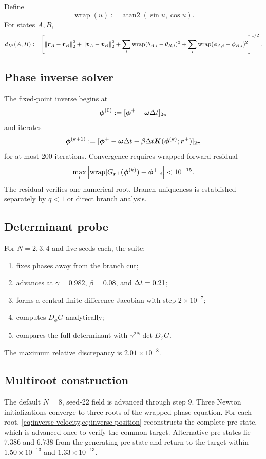 Define
\[
\operatorname{wrap}(u)
:=
\operatorname{atan2}(\sin u,\cos u).
\]
For states \(A,B\),
\begin{equation}
d_{L^2}(A,B)
:=
\left[
\left\lVert \bm r_A-\bm r_B\right\rVert_2^2
+\left\lVert \bm v_A-\bm v_B\right\rVert_2^2
+\sum_i\operatorname{wrap}(\theta_{A,i}-\theta_{B,i})^2
+\sum_i\operatorname{wrap}(\phi_{A,i}-\phi_{B,i})^2
\right]^{1/2}.
\label{eq:state-distance}
\end{equation}

\subsection{Phase inverse solver}

The fixed-point inverse begins at
\[
\bm\phi^{(0)}
:=
[\bm\phi^+-\bm\omega\Delta t]_{2\pi}
\]
and iterates
\[
\bm\phi^{(k+1)}
:=
[
\bm\phi^+-\bm\omega\Delta t
-\beta\Delta t\bm K(\bm\phi^{(k)};\bm r^+)
]_{2\pi}
\]
for at most 200 iterations. Convergence requires wrapped forward residual
\[
\max_i
\left\lvert 
\operatorname{wrap}
[G_{\bm r^+}(\bm\phi^{(k)})-\bm\phi^+]_i
\right\rvert
<10^{-15}.
\]
The residual verifies one numerical root. Branch uniqueness is established separately by \(q<1\) or direct branch analysis.

\subsection{Determinant probe}

For \(N=2,3,4\) and five seeds each, the suite:
\begin{enumerate}
\item fixes phases away from the branch cut;
\item advances at \(\gamma=0.982\), \(\beta=0.08\), and \(\Delta t=0.21\);
\item forms a central finite-difference Jacobian with step \(2\times10^{-7}\);
\item computes \(D_\phi G\) analytically;
\item compares the full determinant with \(\gamma^{2N}\det D_\phi G\).
\end{enumerate}
The maximum relative discrepancy is \(2.01\times10^{-8}\).

\subsection{Multiroot construction}

The default \(N=8\), seed-22 field is advanced through step 9. Three Newton initializations converge to three roots of the wrapped phase equation. For each root, \cref{eq:inverse-velocity,eq:inverse-position} reconstructs the complete pre-state, which is advanced once to verify the common target. Alternative pre-states lie \(7.386\) and \(6.738\) from the generating pre-state and return to the target within \(1.50\times10^{-13}\) and \(1.33\times10^{-13}\).

